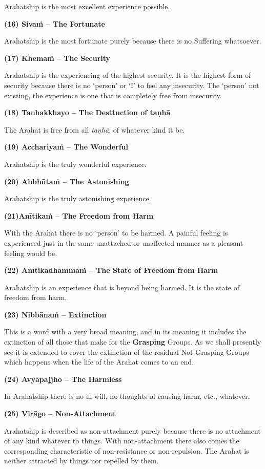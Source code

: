Arahatship is the most excellent experience possible.

\textbf{(16) Sivaṁ -- The Fortunate}

Arahatship is the most fortunate purely because there is no Suffering whatsoever.

\textbf{(17) Khemaṁ -- The Security}

Arahatship is the experiencing of the highest security. It is the highest form of security because there is no `person' or `I' to feel any insecurity. The `person' not existing, the experience is one that is completely free from insecurity.

\textbf{(18) Tanhakkhayo -- The Desttuction of taṇhā}

The Arahat is free from all \emph{taṇhā}, of whatever kind it be.

\textbf{(19) Acchariyaṁ -- The Wonderful}

Arahatship is the truly wonderful experience.

\textbf{(20) Abbhūtaṁ -- The Astonishing}

Arahatship is the truly astonishing experience.

\textbf{(21)Anītikaṁ -- The Freedom from Harm}

With the Arahat there is no `person' to be harmed. A painful feeling is experienced just in the same unattached or unaffected manner as a pleasant feeling would be.

\textbf{(22) Anītikadhammaṁ -- The State of Freedom from Harm}

Arahatship is an experience that is beyond being harmed. It is the state of freedom from harm.

\textbf{(23) Nibbānaṁ -- Extinction}

This is a word with a very broad meaning, and in its meaning it includes the extinction of all those that make for the \textbf{Grasping} Groups. As we shall presently see it is extended to cover the extinction of the residual Not-Grasping Groups which happens when the life of the Arahat comes to an end.

\textbf{(24) Avyāpajjho -- The Harmless}

In Arahatship there is no ill-will, no thoughts of causing harm, etc., whatever.

\textbf{(25) Virāgo -- Non-Attachment}

Arahatship is described as non-attachment purely because there is no attachment of any kind whatever to things. With non-attachment there also comes the corresponding characteristic of non-resistance or non-repulsion. The Arahat is neither attracted by things nor repelled by them.

